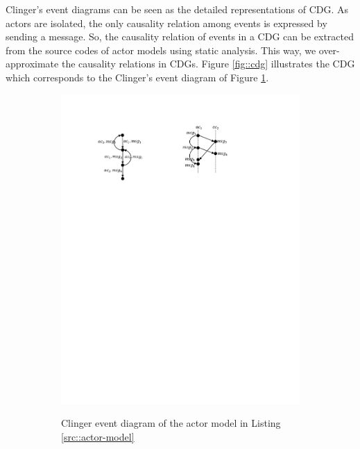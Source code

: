 Clinger's event diagrams can be seen as the detailed representations of CDG. As actors are isolated, the only causality relation among events is expressed by sending a message. So, the causality relation of events in a CDG can be extracted from the source codes of actor models using static analysis. This way, we over-approximate the causality relations in CDGs. Figure \ref{fig::cdg} illustrates the CDG which corresponds to the Clinger's event diagram of Figure \ref{fig::clinger}.

\begin{figure}
\centering
\begin{subfigure}[b]{0.2\textwidth}
  \centering
  \small{
   \includegraphics[width=.8\textwidth]{resources/clinger.pdf}
  }
  \caption{Clinger event diagram of the actor model in Listing \ref{src::actor-model}}
  \label{fig::clinger}
\end{subfigure}
\qquad
\begin{subfigure}[b]{0.2\textwidth}


\end{subfigure}
\end{figure}
